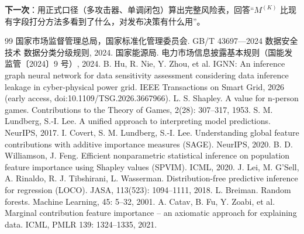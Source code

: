 \documentclass[zihao=-4,a4paper]{ctexart}
\newcommand{\M}{M^{(K)}}
\begin{document}
\textbf{下一次}：用正式口径（多攻击器、单调闭包）算出完整风险表，回答“$\M$ 比现有字段打分方法多看到了什么，对发布决策有什么用”。

\begin{thebibliography}{99}
\small
{} 国家市场监督管理总局，国家标准化管理委员会. GB/T 43697—2024 数据安全技术 数据分类分级规则, 2024.
 国家能源局. 电力市场信息披露基本规则（国能发监管〔2024〕9 号）, 2024.
 B. Hu, R. Nie, Y. Zhou, et al. IGNN: An inference graph neural network for data sensitivity assessment considering data inference leakage in cyber-physical power grid. IEEE Transactions on Smart Grid, 2026 (early access, doi:10.1109/TSG.2026.3667966).
 L. S. Shapley. A value for n-person games. Contributions to the Theory of Games, 2(28): 307--317, 1953.
 S. M. Lundberg, S.-I. Lee. A unified approach to interpreting model predictions. NeurIPS, 2017.
 I. Covert, S. M. Lundberg, S.-I. Lee. Understanding global feature contributions with additive importance measures (SAGE). NeurIPS, 2020.
 B. D. Williamson, J. Feng. Efficient nonparametric statistical inference on population feature importance using Shapley values (SPVIM). ICML, 2020.
 J. Lei, M. G'Sell, A. Rinaldo, R. J. Tibshirani, L. Wasserman. Distribution-free predictive inference for regression (LOCO). JASA, 113(523): 1094--1111, 2018.
 L. Breiman. Random forests. Machine Learning, 45: 5--32, 2001.
 A. Catav, B. Fu, Y. Zoabi, et al. Marginal contribution feature importance -- an axiomatic approach for explaining data. ICML, PMLR 139: 1324--1335, 2021.
\end{thebibliography}
\end{document}
